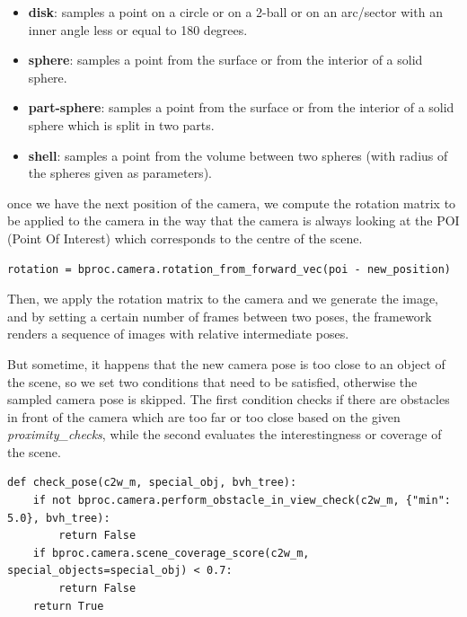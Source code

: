 \begin{itemize}
    \item \textbf{disk}: samples a point on a circle or on a 2-ball or on an arc/sector with an inner angle less or equal to 180 degrees.
    \item \textbf{sphere}: samples a point from the surface or from the interior of a solid sphere.
    \item \textbf{part-sphere}: samples a point from the surface or from the interior of a solid sphere which is split in two parts.
    \item \textbf{shell}: samples a point from the volume between two spheres (with radius of the spheres given as parameters).
\end{itemize}
once we have the next position of the camera, we compute the rotation matrix to be applied to the camera in the way that the camera is always looking at the POI (Point Of Interest) which corresponds to the centre of the scene.
\begin{lstlisting}[captionpos=b, label={lst:compute-camera-rotation}, caption={Computes the rotatition matrix for the camera.}, captionpos=b]
rotation = bproc.camera.rotation_from_forward_vec(poi - new_position)
\end{lstlisting}
Then, we apply the rotation matrix to the camera and we generate the image, and by setting a certain number of frames between two poses, the framework renders a sequence of images with relative intermediate poses.


But sometime, it happens that the new camera pose is too close to an object of the scene, so we set two conditions that need to be satisfied, otherwise the sampled camera pose is skipped.
The first condition checks if there are obstacles in front of the camera which are too far or too close based on the given \textit{proximity\_checks}, while the second evaluates the interestingness or coverage of the scene.
\begin{lstlisting}[captionpos=b, label={lst:lstlisting}, caption={Checks whether the camera pose satisfies the conditions.}, captionpos=b]
def check_pose(c2w_m, special_obj, bvh_tree):
    if not bproc.camera.perform_obstacle_in_view_check(c2w_m, {"min": 5.0}, bvh_tree):
        return False
    if bproc.camera.scene_coverage_score(c2w_m, special_objects=special_obj) < 0.7:
        return False
    return True
\end{lstlisting}


